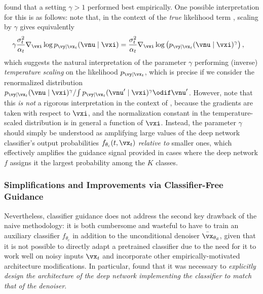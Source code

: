 \documentclass[../../book-main.tex]{subfiles}
\begin{document}
\citet{Dhariwal2021-hg} found that a setting $\gamma > 1$ performed
best empirically.
One possible interpretation for this is as follows: note that, in the context of
the \textit{true} likelihood term
, scaling by $\gamma$
gives equivalently
\begin{align}
    \gamma\frac{\sigma_t^2}{\alpha_t} \nabla_{\vxi}\log p_{\vy \mid
    \vx_t}(\vnu\mid
    \vxi)
    &=
    \frac{\sigma_t^2}{\alpha_t} \nabla_{\vxi}\log \left(
        p_{\vy \mid \vx_t}(\vnu\mid \vxi)^\gamma
    \right), %
\end{align}
which suggests the natural interpretation of the parameter $\gamma$ performing
(inverse) \textit{temperature scaling} on the likelihood
$p_{\vy \mid \vx_t}$, which is precise if we consider the renormalized
distribution
$ { p_{\vy \mid \vx_t}(\vnu\mid \vxi)^\gamma } / { \int p_{\vy \mid
    \vx_t}(\vnu'\mid
\vxi)^\gamma \odif \vnu' } $.
However, note that this \textit{is not} a rigorous interpretation in the context
of , because the
gradients are taken with respect to $\vxi$, and the normalization constant in
the temperature-scaled distribution is in general a function of $\vxi$.
Instead, the parameter $\gamma$ should simply be understood as amplifying large
values of the deep network classifier's output probabilities
$f_{\theta_{\mathrm{c}}}(t, \vx_t)$ \textit{relative to} smaller ones,
which effectively amplifies the guidance signal provided in cases where the deep
network $f$ assigns it the largest probability among the $K$ classes.

\subsubsection{Simplifications and Improvements via Classifier-Free Guidance}

Nevertheless, classifier guidance does not address the second key drawback of
the naive methodology: it is both cumbersome and wasteful to have to
train an auxiliary classifier $f_{\theta_{\mathrm{c}}}$ in addition
to the unconditional
denoiser $\bar{\vx}_{\theta_{\mathrm{d}}}$, given
that it is not possible to directly adapt a pretrained classifier
due to the need for it to work well on noisy inputs $\vx_t$ and incorporate
other empirically-motivated architecture modifications.
In particular, \citet{Dhariwal2021-hg} found that it was necessary to
\textit{explicitly
    design the architecture of the deep network implementing the
    classifier to match
that of the denoiser}.
\end{document}
